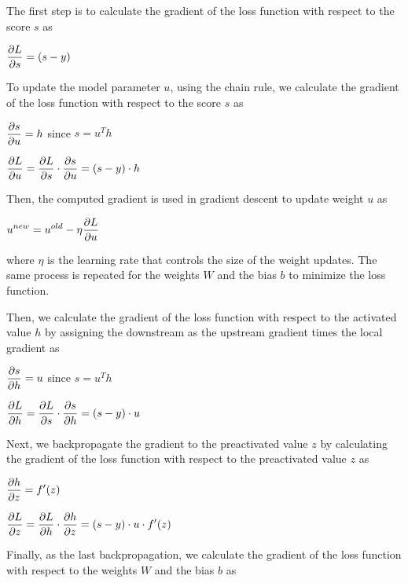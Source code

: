 \documentclass[12pt]{article}
\begin{document}
\begin{description}
  The first step is to calculate the gradient of the loss function with respect to the score $s$ as

  \begin{center}
    $\displaystyle{\pdv{L}{s} = (s - y)}$
  \end{center}

  To update the model parameter $u$, using the chain rule, we calculate the gradient of the loss function with respect to the score $s$ as

  \begin{center}
    $\displaystyle{\pdv{s}{u} =  h}$ since $s = u^Th$

    $\displaystyle{\pdv{L}{u} = \pdv{L}{s} \cdot \pdv{s}{u} = (s - y) \cdot h}$
  \end{center}

  Then, the computed gradient is used in gradient descent to update weight $u$ as

  \begin{center}
    $\displaystyle{u^{new} = u^{old} - \eta \pdv{L}{u}}$
  \end{center}

  where $\eta$ is the learning rate that controls the size of the weight updates. The same process is repeated for the weights $W$ and the bias $b$ to minimize the loss function.

  Then, we calculate the gradient of the loss function with respect to the activated value $h$ by assigning the downstream as the upstream gradient times the local gradient as

  \begin{center}
    $\displaystyle{\pdv{s}{h} =  u}$ since $s = u^Th$

    $\displaystyle{\pdv{L}{h} = \pdv{L}{s} \cdot \pdv{s}{h} = (s - y) \cdot u}$
  \end{center}

  Next, we backpropagate the gradient to the preactivated value $z$ by calculating the gradient of the loss function with respect to the preactivated value $z$ as

  \begin{center}
    $\displaystyle{\pdv{h}{z} = f'(z)}$

    $\displaystyle{\pdv{L}{z} = \pdv{L}{h} \cdot \pdv{h}{z} = (s - y) \cdot u \cdot f'(z)}$
  \end{center}

  Finally, as the last backpropagation, we calculate the gradient of the loss function with respect to the weights $W$ and the bias $b$ as


\end{description}
\end{document}
